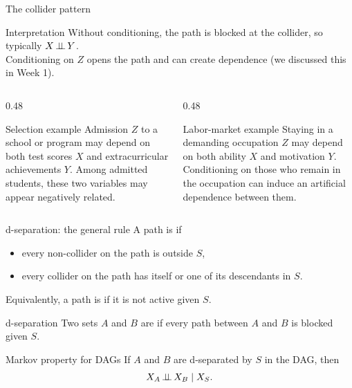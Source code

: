 \documentclass[dvipsnames,aspectratio=169,handout]{beamer}
\begin{document}
\begin{frame}{The collider pattern}
\begin{center}
\end{center}
\vspace{-4mm}
\begin{alertblock}{Interpretation}
Without conditioning, the path is blocked at the collider, so typically $X\mbox{\,$\perp\!\!\!\perp$\,} Y$.\\[3mm]

Conditioning on $Z$ opens the path and can create dependence (we discussed this in Week 1).
\end{alertblock}

\begin{columns}[T]
\begin{column}{0.48\textwidth}
\begin{block}{Selection example}
Admission $Z$ to a school or program may depend on both test scores $X$ and extracurricular achievements $Y$.
Among admitted students, these two variables may appear negatively related.
\end{block}
\end{column}
\begin{column}{0.48\textwidth}
\begin{block}{Labor-market example}
Staying in a demanding occupation $Z$ may depend on both ability $X$ and motivation $Y$.
Conditioning on those who remain in the occupation can induce an artificial dependence between them.
\end{block}
\end{column}
\end{columns}
\end{frame}

\begin{frame}{d-separation: the general rule}
A path is  if
\begin{itemize}
    \item every non-collider on the path is outside $S$,
    \item every collider on the path has itself or one of its descendants in $S$.
\end{itemize}

Equivalently, a path is  if it is not active given $S$.

\begin{alertblock}{d-separation}
Two sets  $A$ and $B$ are 
if every path between $A$ and $B$ is blocked given $S$.
\end{alertblock}

\begin{block}{Markov property for DAGs}
If $A$ and $B$ are d-separated by $S$ in the DAG, then
\[
X_A\mbox{\,$\perp\!\!\!\perp$\,} X_B\mid X_S.
\]
\end{block}
\end{frame}
\end{document}
